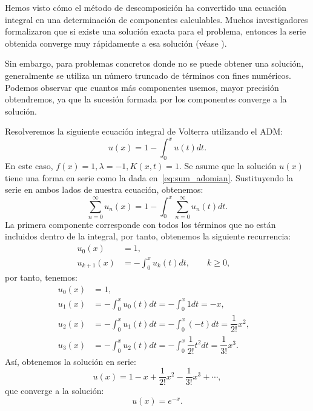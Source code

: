 \begin{observacion}
Hemos visto cómo el método de descomposición ha convertido una ecuación integral en una determinación de componentes calculables. Muchos investigadores formalizaron que si existe una solución exacta para el problema, entonces la serie obtenida converge muy rápidamente a esa solución (véase \cite{WazWaz}).

Sin embargo, para problemas concretos donde no se puede obtener una solución, generalmente se utiliza un número truncado de términos con fines numéricos. Podemos observar que cuantos más componentes usemos, mayor precisión obtendremos, ya que la sucesión formada por los componentes converge a la solución.
\end{observacion}

\begin{ejemplo}
	Resolveremos la siguiente ecuación integral de Volterra utilizando el ADM:
	\begin{equation}
		u(x) = 1 - \int_{0}^{x} u(t)dt.
	\end{equation}
	En este caso, $f(x) = 1, \lambda = -1, K(x,t) = 1.$ Se asume que la solución $u(x)$ tiene una forma en serie como la dada en~\eqref{eq:sum_adomian}. Sustituyendo la serie en ambos lados de nuestra ecuación, obtenemos:
	\begin{equation}
		\sum_{n=0}^{\infty} u_n(x) = 1 - \int_{0}^{x} \sum_{n=0}^{\infty} u_n(t)dt.
	\end{equation}
	La primera componente corresponde con todos los términos que no están incluidos dentro de la integral, por tanto, obtenemos la siguiente recurrencia:
	\begin{align}
		u_0(x) &= 1,      &   \\
		u_{k+1}(x) &= - \int_{0}^{x} u_k(t)dt, \qquad k \geqslant 0,         & 
	\end{align}
	por tanto, tenemos:
	\begin{align}
		u_0(x) &= 1,      &   \\
		u_{1}(x) &= - \int_{0}^{x} u_0(t)dt = -\int_{0}^{x} 1dt = -x,    &  \\
		u_{2}(x) &= - \int_{0}^{x} u_1(t)dt = -\int_{0}^{x} (-t)dt = \dfrac{1}{2!}x^2,    &  \\
		u_{3}(x) &= - \int_{0}^{x} u_2(t)dt = -\int_{0}^{x} \dfrac{1}{2!}t^2dt = \dfrac{1}{3!}x^3.    & 
	\end{align}	
	Así, obtenemos la solución en serie:
	\begin{equation}
		u(x) = 1 - x + \dfrac{1}{2!}x^2 - \dfrac{1}{3!}x^3 + \cdots,
	\end{equation}
	que converge a la solución:
	\begin{equation}
		u(x) = e^{-x}.
	\end{equation}
\end{ejemplo}

